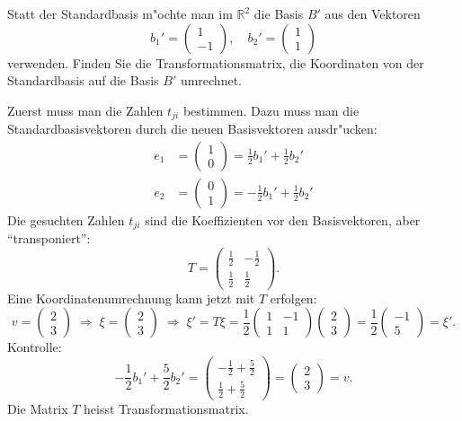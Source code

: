 \begin{beispiel}
Statt der Standardbasis m"ochte man im $\mathbb R^2$ die Basis
$B'$
aus den Vektoren 
\[
b_1'=\begin{pmatrix}1\\-1\end{pmatrix}
,\quad
b_2'=\begin{pmatrix}1\\1\end{pmatrix}
\]
verwenden. Finden Sie die Transformationsmatrix, die Koordinaten von
der Standardbasis auf die Basis $B'$ umrechnet.

Zuerst muss man die Zahlen $t_{ji}$ bestimmen. Dazu muss man die
Standardbasisvektoren durch die neuen Basisvektoren ausdr"ucken:
\begin{align*}
e_1&=\begin{pmatrix}1\\0\end{pmatrix}=\frac12b_1'+\frac12b_2'\\
e_2&=\begin{pmatrix}0\\1\end{pmatrix}=-\frac12b_1'+\frac12b_2'
\end{align*}
Die gesuchten Zahlen $t_{ji}$ sind die Koeffizienten vor den Basisvektoren,
aber ``transponiert'':
\[
T=\begin{pmatrix}\frac12&-\frac12\\\frac12&\frac12\end{pmatrix}.
\]
Eine Koordinatenumrechnung kann jetzt mit $T$ erfolgen:
\[
v=\begin{pmatrix}2\\3\end{pmatrix}
\;\Rightarrow\;
\xi=\begin{pmatrix}2\\3\end{pmatrix}
\;\Rightarrow\;
\xi'=T\xi=\frac12\begin{pmatrix}1&-1\\1&1\end{pmatrix} \begin{pmatrix}2\\3\end{pmatrix}
=\frac12\begin{pmatrix}-1\\5\end{pmatrix}=\xi'.
\]
Kontrolle:
\[
-\frac12b_1'+\frac52b_2'
=
\begin{pmatrix}-\frac12+\frac52\\\frac12+\frac52\end{pmatrix}
=
\begin{pmatrix}2\\3\end{pmatrix}=v.
\]
Die Matrix $T$ heisst Transformationsmatrix.
\end{beispiel}

